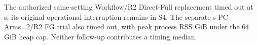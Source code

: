 The authorized same-setting Workflow/R2 Direct-Full replacement timed out at \ADWorkflowCapSeconds{} s; its original operational interruption remains in S4. The separate \ADPCCapSeconds{} s PC Arms=2/R2 FG trial also timed out, with peak process RSS \ADPCPeakRSSGiB{} GiB under the 64 GiB heap cap. Neither follow-up contributes a timing median.
